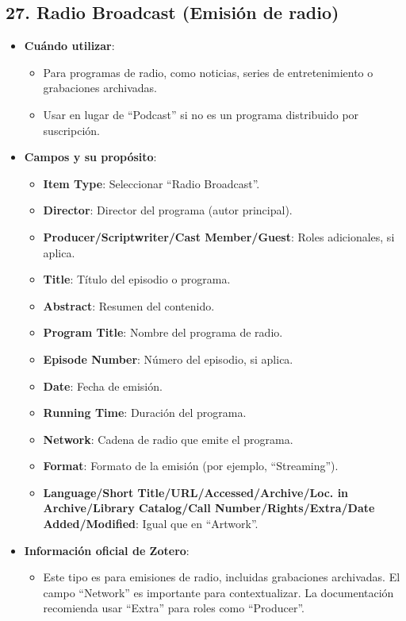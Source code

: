 \documentclass[
  jou,
  floatsintext,
  longtable,
  a4paper,
  nolmodern,
  notxfonts,
  notimes,
  colorlinks=true,linkcolor=blue,citecolor=blue,urlcolor=blue]{apa7}
\providecommand{\tightlist}{%
  \setlength{\itemsep}{0pt}\setlength{\parskip}{0pt}}
\begin{document}
\subsection{27. Radio Broadcast (Emisión de
radio)}\label{radio-broadcast-emisiuxf3n-de-radio}

\begin{itemize}
\tightlist
\item
  \textbf{Cuándo utilizar}:

  \begin{itemize}
  \tightlist
  \item
    Para programas de radio, como noticias, series de entretenimiento o
    grabaciones archivadas.
  \item
    Usar en lugar de ``Podcast'' si no es un programa distribuido por
    suscripción.
  \end{itemize}
\item
  \textbf{Campos y su propósito}:

  \begin{itemize}
  \tightlist
  \item
    \textbf{Item Type}: Seleccionar ``Radio Broadcast''.
  \item
    \textbf{Director}: Director del programa (autor principal).
  \item
    \textbf{Producer/Scriptwriter/Cast Member/Guest}: Roles adicionales,
    si aplica.
  \item
    \textbf{Title}: Título del episodio o programa.
  \item
    \textbf{Abstract}: Resumen del contenido.
  \item
    \textbf{Program Title}: Nombre del programa de radio.
  \item
    \textbf{Episode Number}: Número del episodio, si aplica.
  \item
    \textbf{Date}: Fecha de emisión.
  \item
    \textbf{Running Time}: Duración del programa.
  \item
    \textbf{Network}: Cadena de radio que emite el programa.
  \item
    \textbf{Format}: Formato de la emisión (por ejemplo, ``Streaming'').
  \item
    \textbf{Language/Short Title/URL/Accessed/Archive/Loc. in
    Archive/Library Catalog/Call Number/Rights/Extra/Date
    Added/Modified}: Igual que en ``Artwork''.
  \end{itemize}
\item
  \textbf{Información oficial de Zotero}:

  \begin{itemize}
  \tightlist
  \item
    Este tipo es para emisiones de radio, incluidas grabaciones
    archivadas. El campo ``Network'' es importante para contextualizar.
    La documentación recomienda usar ``Extra'' para roles como
    ``Producer''.
  \end{itemize}
\end{itemize}
\end{document}
